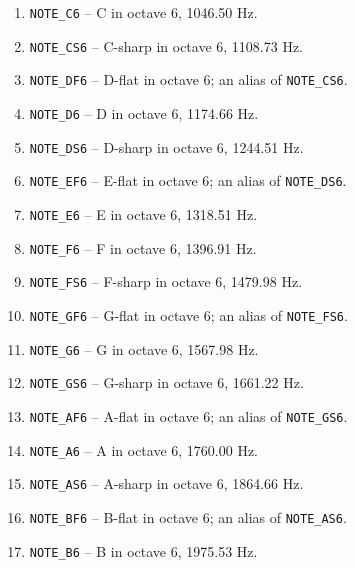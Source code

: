 \begin{enumerate}
    \item \texttt{NOTE\_C6} -- C in octave 6, 1046.50 Hz.
    \item \texttt{NOTE\_CS6} -- C-sharp in octave 6, 1108.73 Hz.
    \item \texttt{NOTE\_DF6} -- D-flat in octave 6; an alias of \texttt{NOTE\_CS6}.
    \item \texttt{NOTE\_D6} -- D in octave 6, 1174.66 Hz.
    \item \texttt{NOTE\_DS6} -- D-sharp in octave 6, 1244.51 Hz.
    \item \texttt{NOTE\_EF6} -- E-flat in octave 6; an alias of \texttt{NOTE\_DS6}.
    \item \texttt{NOTE\_E6} -- E in octave 6, 1318.51 Hz.
    \item \texttt{NOTE\_F6} -- F in octave 6, 1396.91 Hz.
    \item \texttt{NOTE\_FS6} -- F-sharp in octave 6, 1479.98 Hz.
    \item \texttt{NOTE\_GF6} -- G-flat in octave 6; an alias of \texttt{NOTE\_FS6}.
    \item \texttt{NOTE\_G6} -- G in octave 6, 1567.98 Hz.
    \item \texttt{NOTE\_GS6} -- G-sharp in octave 6, 1661.22 Hz.
    \item \texttt{NOTE\_AF6} -- A-flat in octave 6; an alias of \texttt{NOTE\_GS6}.
    \item \texttt{NOTE\_A6} -- A in octave 6, 1760.00 Hz.
    \item \texttt{NOTE\_AS6} -- A-sharp in octave 6, 1864.66 Hz.
    \item \texttt{NOTE\_BF6} -- B-flat in octave 6; an alias of \texttt{NOTE\_AS6}.
    \item \texttt{NOTE\_B6} -- B in octave 6, 1975.53 Hz.


\end{enumerate}
